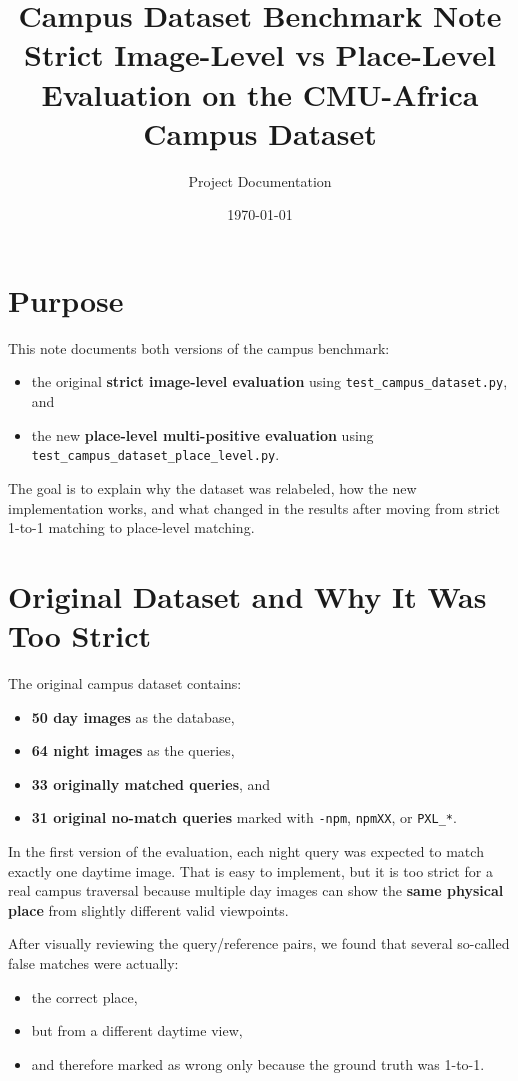 \documentclass[11pt]{article}
\title{\textbf{Campus Dataset Benchmark Note}\\[4pt]
Strict Image-Level vs Place-Level Evaluation on the CMU-Africa Campus Dataset}
\author{Project Documentation}
\date{\today}
\newcommand{\file}[1]{\texttt{#1}}
\newcommand{\code}[1]{\texttt{#1}}
\begin{document}
\maketitle

\section*{Purpose}
This note documents both versions of the campus benchmark:
\begin{itemize}[leftmargin=*]
  \item the original \textbf{strict image-level evaluation} using \file{test\_campus\_dataset.py}, and
  \item the new \textbf{place-level multi-positive evaluation} using \file{test\_campus\_dataset\_place\_level.py}.
\end{itemize}

The goal is to explain why the dataset was relabeled, how the new implementation works, and what changed in the results after moving from strict 1-to-1 matching to place-level matching.

\section{Original Dataset and Why It Was Too Strict}
The original campus dataset contains:
\begin{itemize}[leftmargin=*]
  \item \textbf{50 day images} as the database,
  \item \textbf{64 night images} as the queries,
  \item \textbf{33 originally matched queries}, and
  \item \textbf{31 original no-match queries} marked with \code{-npm}, \code{npmXX}, or \code{PXL\_*}.
\end{itemize}

In the first version of the evaluation, each night query was expected to match exactly one daytime image. That is easy to implement, but it is too strict for a real campus traversal because multiple day images can show the \textbf{same physical place} from slightly different valid viewpoints.

After visually reviewing the query/reference pairs, we found that several so-called false matches were actually:
\begin{itemize}[leftmargin=*]
  \item the correct place,
  \item but from a different daytime view,
  \item and therefore marked as wrong only because the ground truth was 1-to-1.
\end{itemize}
\end{document}

